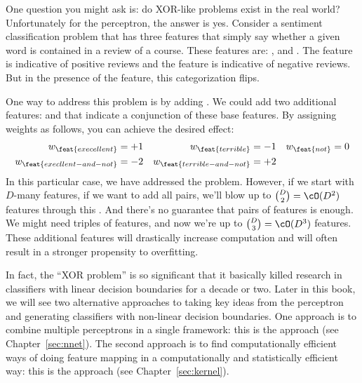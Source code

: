 
One question you might ask is: do XOR-like problems exist in the real
world?  Unfortunately for the perceptron, the answer is yes.  Consider
a sentiment classification problem that has three features that simply
say whether a given word is contained in a review of a course.  These
features are: ,  and .  The
 feature is indicative of positive reviews and the
 feature is indicative of negative reviews.  But in the
presence of the  feature, this categorization flips.

One way to address this problem is by adding .  We could add two additional features:
 and  that indicate
a conjunction of these base features.  By assigning weights as
follows, you can achieve the desired effect:
\begin{align*}
w_{\feat{execellent}} &= +1
& w_{\feat{terrible}} &= -1
& w_{\feat{not}} &= 0 \\
w_{\feat{execllent-and-not}} &= -2
& w_{\feat{terrible-and-not}} &= +2
\end{align*}
In this particular case, we have addressed the problem.  However, if
we start with $D$-many features, if we want to add all pairs, we'll
blow up to ${D \choose 2} = \cO(D^2)$ features through this
.  And there's no guarantee that pairs of
features is enough.  We might need triples of features, and now we're
up to ${D \choose 3} = \cO(D^3)$ features.  These additional features
will drastically increase computation and will often result in a
stronger propensity to overfitting.


In fact, the ``XOR problem'' is so significant that it basically
killed research in classifiers with linear decision boundaries for a
decade or two.  Later in this book, we will see two alternative
approaches to taking key ideas from the perceptron and generating
classifiers with non-linear decision boundaries.  One approach is to
combine multiple perceptrons in a single framework: this is the
 approach (see Chapter~\ref{sec:nnet}).  The
second approach is to find computationally efficient ways of doing
feature mapping in a computationally and statistically efficient way:
this is the  approach (see Chapter~\ref{sec:kernel}).

